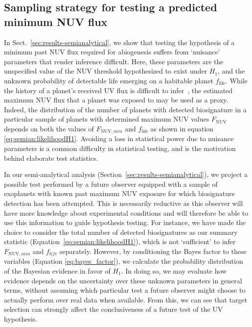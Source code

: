 \documentclass[twocolumn,twocolappendix,linenumbers]{aastex631}
\begin{document}
\subsection{Sampling strategy for testing a predicted minimum \gls{NUV} flux} %
In Sect.~\ref{sec:results-semianalytical}, we show that testing the hypothesis of a minimum past \gls{NUV} flux required for abiogenesis suffers from `nuisance' parameters that render inference difficult.
Here, these parameters are the unspecified value of the \gls{NUV} threshold hypothesized to exist under $H_1$, and the unknown probability of detectable life emerging on a habitable planet $f_{\mathrm{life}}$.
While the history of a planet's received UV flux is difficult to infer~\citep[e.g.,][]{Richey-Yowell2023}, the estimated maximum \gls{NUV} flux that a planet was exposed to may be used as a proxy.
Indeed, the distribution of the number of planets with detected biosignature in a particular sample of planets with determined maximum \gls{NUV} values $F_{\mathrm{NUV}}$ depends on both the values of $F_{\mathrm{NUV},min}$ and $f_{\mathrm{life}}$ as shown in equation \ref{eq:semian:likelihoodH1}.
Avoiding a loss in statistical power due to nuisance parameters is a common difficulty in statistical testing, and is the motivation behind elaborate test statistics.

In our semi-analytical analysis (Section~\ref{sec:results-semianalytical}), we project a possible test performed by a future observer equipped with a sample of exoplanets with known past maximum \gls{NUV} exposure for which biosignature detection has been attempted.
This is necessarily reductive as this observer will have more knowledge about experimental conditions and will therefore be able to use this information to guide hypothesis testing.
For instance, we have made the choice to consider the total number of detected biosignatures as our summary statistic (Equation~\ref{eq:semian:likelihoodH1}), which is not `sufficient' to infer $F_{\mathrm{NUV},min}$ and $f_{life}$ separately.
However, by conditioning the Bayes factor to these variables (Equation \ref{eq:bayes_factor}), we calculate the probability distribution of the Bayesian evidence in favor of $H_1$.
In doing so, we may evaluate how evidence depends on the uncertainty over these unknown parameters in general terms, without assuming which particular test a future observer might choose to actually perform over real data when available.
From this, we can see that target selection can strongly affect the conclusiveness of a future test of the UV hypothesis.
\end{document}
